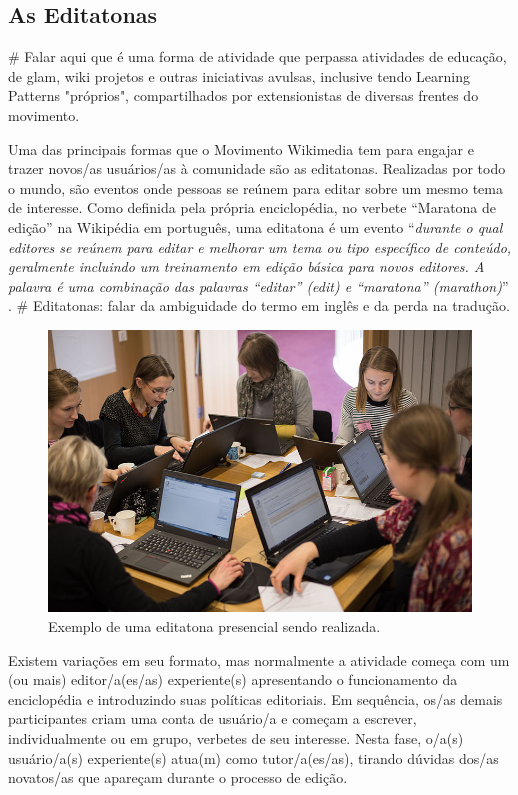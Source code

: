 \subsection{As Editatonas}

# Falar aqui que é uma forma de atividade que perpassa atividades de educação, de glam, wiki projetos e outras iniciativas avulsas, inclusive tendo Learning Patterns "próprios", compartilhados por extensionistas de diversas frentes do movimento.



Uma das principais formas que o Movimento Wikimedia tem para engajar e trazer novos/as usuários/as à comunidade são as editatonas. Realizadas por todo o mundo, são eventos onde pessoas se reúnem para editar sobre um mesmo tema de interesse. Como definida pela própria enciclopédia, no verbete ``Maratona de edição'' na Wikipédia em português, uma editatona é um evento ``\textit{durante o qual editores se reúnem para editar e melhorar um tema ou tipo específico de conteúdo, geralmente incluindo um treinamento em edição básica para novos editores. A palavra é uma combinação das palavras ``editar'' (\textit{edit}) e ``maratona'' (\textit{marathon})}'' .
# Editatonas: falar da ambiguidade do termo em inglês e da perda na tradução.


\begin{figure}[H]
    \centering
    \includegraphics[width=1\textwidth]{Images/editatona_antiga.jpg}
    \caption{Exemplo de uma editatona presencial sendo realizada.}
    \label{fig:editatona_antiga}
\end{figure}




Existem variações em seu formato, mas normalmente a atividade começa com um (ou mais) editor/a(es/as) experiente(s) apresentando o funcionamento da enciclopédia e introduzindo suas políticas editoriais. Em sequência, os/as demais participantes criam uma conta de usuário/a e começam a escrever, individualmente ou em grupo, verbetes de seu interesse. Nesta fase, o/a(s) usuário/a(s) experiente(s) atua(m) como tutor/a(es/as), tirando dúvidas dos/as novatos/as que apareçam durante o processo de edição.


